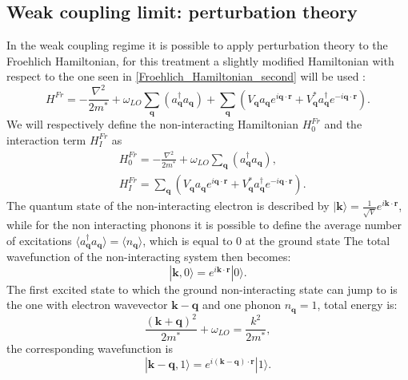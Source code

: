\documentclass[12pt, a4paper]{report}
\numberwithin{equation}{section}
\begin{document}
\subsection{Weak coupling limit: perturbation theory}
In the weak coupling regime it is possible to apply perturbation theory to the Froehlich Hamiltonian, for this treatment a slightly modified 
Hamiltonian with respect to the one seen in \ref{Froehlich_Hamiltonian_second} will be used \cite{alexandrov2010advances}:
\begin{equation}
    H^{Fr}=-\frac{\nabla^2}{2m^*}+\omega_{LO}\sum_{\mathbf{q}}(a_\mathbf{q}^\dagger a_\mathbf{q})+\sum_{\mathbf{q}}(V_\mathbf{q}a_\mathbf{q}e^{i\mathbf{q}\cdot\mathbf{r}}+V^*_\mathbf{q}a^\dagger_\mathbf{q}e^{-i\mathbf{q}\cdot\mathbf{r}}).
\end{equation}
We will respectively define the non-interacting Hamiltonian $H_0^{Fr}$ and the interaction term $H_I^{Fr}$ as
\begin{equation}
\begin{split}
    &H_0^{Fr}=-\frac{\nabla^2}{2m^*}+\omega_{LO}\sum_{\mathbf{q}}(a_\mathbf{q}^\dagger a_\mathbf{q}),\\
    &H_I^{Fr}=\sum_{\mathbf{q}}(V_\mathbf{q}a_\mathbf{q}e^{i\mathbf{q}\cdot\mathbf{r}}+V^*_\mathbf{q}a^\dagger_\mathbf{q}e^{-i\mathbf{q}\cdot\mathbf{r}}).
\end{split}
\end{equation}
The quantum state of the non-interacting electron is described by $|\mathbf{k}\rangle=\frac{1}{\sqrt{V}}e^{i\mathbf{k}\cdot\mathbf{r}}$, 
while for the non interacting phonons it is possible to define the average number of excitations $\langle a^\dagger_\mathbf{q}a_\mathbf{q}\rangle=\langle n_\mathbf{q}\rangle$, 
which is equal to 0 at the ground state
The total wavefunction of the non-interacting system then becomes:
\begin{equation}
    |{\mathbf{k},0}\rangle=e^{i\mathbf{k}\cdot\mathbf{r}}|0\rangle.
\end{equation}
The first excited state to which the ground non-interacting state can jump to is the one with electron wavevector $\mathbf{k}-\mathbf{q}$ and 
one phonon $n_\mathbf{q}=1$, total energy is:
\begin{equation}
    \frac{(\mathbf{k}+\mathbf{q})^2}{2m^*}+\omega_{LO}=\frac{k^2}{2m^*},
\end{equation}
the corresponding wavefunction is
\begin{equation}
    |\mathbf{k}-\mathbf{q},1\rangle =e^{i(\mathbf{k}-\mathbf{q})\cdot \mathbf{r}}|1\rangle.
\end{equation}
\end{document}

